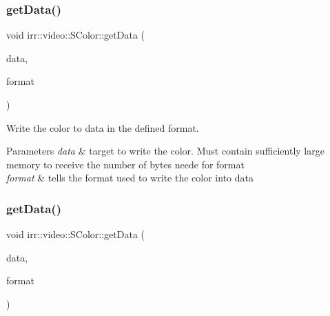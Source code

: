 \subsubsection{\texorpdfstring{get\+Data()}{getData()}\hspace{0.1cm}{\footnotesize\ttfamily [1/2]}}
{\footnotesize\ttfamily void irr\+::video\+::\+S\+Color\+::get\+Data (\begin{DoxyParamCaption}\item[{void $\ast$}]{data,  }\item[{\hyperlink{namespaceirr_1_1video_a1d5e487888c32b1674a8f75116d829ed}{E\+C\+O\+L\+O\+R\+\_\+\+F\+O\+R\+M\+AT}}]{format }\end{DoxyParamCaption})\hspace{0.3cm}{\ttfamily [inline]}}



Write the color to data in the defined format. 


\begin{DoxyParams}{Parameters}
{\em data} & target to write the color. Must contain sufficiently large memory to receive the number of bytes neede for format \\
\hline
{\em format} & tells the format used to write the color into data \\
\hline
\end{DoxyParams}
\mbox{\label{classirr_1_1video_1_1SColor_a7cba1b914230289de9c91ff28be96bc9}} 
\subsubsection{\texorpdfstring{get\+Data()}{getData()}\hspace{0.1cm}{\footnotesize\ttfamily [2/2]}}
{\footnotesize\ttfamily void irr\+::video\+::\+S\+Color\+::get\+Data (\begin{DoxyParamCaption}\item[{void $\ast$}]{data,  }\item[{\hyperlink{namespaceirr_1_1video_a1d5e487888c32b1674a8f75116d829ed}{E\+C\+O\+L\+O\+R\+\_\+\+F\+O\+R\+M\+AT}}]{format }\end{DoxyParamCaption})\hspace{0.3cm}{\ttfamily [inline]}}



